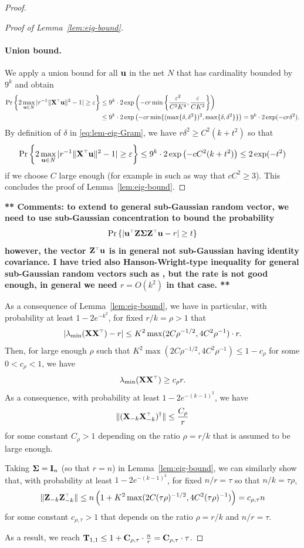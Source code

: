 \documentclass[11pt]{article}
\begin{document}
\begin{proof}
\begin{proof}[Proof of Lemma~\ref{lem:eig-bound}]
\paragraph{Union bound.} We apply a union bound for all $\mathbf u$ in the net $\mathit N$ that has cardinality bounded by $9^k$ and obtain
\begin{align*}
  \Pr \left\{ 2 \max_{\u \in \mathit N} | r^{-1} \| \X^\top \u \|^2 - 1 | \ge \varepsilon \right\} &\le 9^k \cdot 2 \exp \left( - c r \min \left\{ \frac{ \varepsilon^2 }{C^2 K^4 },  \frac{\varepsilon}{C K^2 } \right\} \right) \\
  &\le 9^k \cdot 2 \exp \left( - c r \min \{ (\max\{\delta, \delta^2\} )^2, \max\{\delta, \delta^2\} \} \right) = 9^k \cdot 2 \exp (- c r \delta^2).
\end{align*}
By definition of $\delta$ in \eqref{eq:lem-eig-Gram}, we have $r \delta^2 \ge C^2 (k +  t^2)$ so that 
\[
  \Pr \left\{ 2 \max_{\u \in \mathit N} | r^{-1} \| \X^\top \u \|^2 - 1 | \ge \varepsilon \right\} \le 9^k \cdot 2 \exp \left(- c C^2 ( k + t^2) \right) \le 2 \exp (-t^2)
\]
if we choose $C$ large enough (for example in such as way that $c C^2 \ge 3$). This concludes the proof of Lemma~\ref{lem:eig-bound}.
\end{proof}


\textbf{** Comments: to extend to general sub-Gaussian random vector, we need to use sub-Gaussian concentration to bound the probability
\[
  \Pr \left\{ | \u^\top \Z \Sigmab \Z^\top \u - r| \ge t \right\}
\]
however, the vector $\Z^\top \u$ is in general not sub-Gaussian having identity covariance. I have tried also Hanson-Wright-type inequality for general sub-Gaussian random vectors such as \cite[Corollary 2.9]{zajkowski2018bounds}, but the rate is not good enough, in general we need $r = O(k^2)$ in that case. **}



As a consequence of Lemma~\ref{lem:eig-bound}, we have in particular, with probability at least $1- 2 e^{-k^2}$, for fixed $r/k = \rho > 1$ that
\[
  |\lambda_{\min} (\X \X^\top) - r| \le K^2 \max ( 2 C \rho^{-1/2}, 4 C^2 \rho^{-1}) \cdot r.
\]
Then, for large enough $\rho$ such that $K^2 \max ( 2 C \rho^{-1/2}, 4 C^2 \rho^{-1}) \le 1 - c_\rho$ for some $0 < c_\rho < 1$, we have
\[
  \lambda_{\min}(\X \X^\top) \ge c_\rho r.
\]
As a consequence, with probability at least $1- 2 e^{-(k-1)^2}$, we have
\[
  \| (\X_{-k}\X_{-k}^\top)^\dagger \| \le \frac{C_\rho}{r}
\]
for some constant $C_\rho > 1$ depending on the ratio $\rho = r/k$ that is assumed to be large enough.

Taking $\mathbf{\Sigma} = \mathbf I_n$ (so that $r = n$) in Lemma~\ref{lem:eig-bound}, we can similarly show that, with probability at least $1- 2 e^{-(k-1)^2}$, for fixed $n/r = \tau$ so that $n/k = \tau \rho$,
\[
  \| \Z_{-k} \Z_{-k}^\top \| \le n \left( 1 + K^2 \max( 2 C (\tau \rho)^{-1/2}, 4 C^2 (\tau \rho)^{-1}) \right) = c_{\rho, \tau} n
\]
for some constant $c_{\rho, \tau} > 1$ that depends on the ratio $\rho = r/k$ and $n/r = \tau$.

As a result, we reach $\mathbf{T}_{1,1} \le 1 + \mathbf C_{\rho, \tau} \cdot \frac{n}{r} = \mathbf C_{\rho, \tau} \cdot \tau$.
\end{proof}

  
\end{document}
